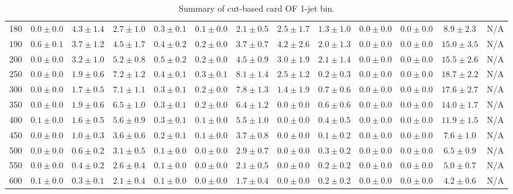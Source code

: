 \begin{table}
{\begin{center}
\begin{tabular}{l | c c | c c c c c c c c  | c c}
180 & $0.0\pm0.0$ & $4.3\pm1.4$ & $2.7\pm1.0$ & $0.3\pm0.1$ & $0.1\pm0.0$ & $2.1\pm0.5$ & $2.5\pm1.7$ & $1.3\pm1.0$ & $0.0\pm0.0$ & $0.0\pm0.0$ & $8.9\pm2.3$ & N/A \\
190 & $0.6\pm0.1$ & $3.7\pm1.2$ & $4.5\pm1.7$ & $0.4\pm0.2$ & $0.2\pm0.0$ & $3.7\pm0.7$ & $4.2\pm2.6$ & $2.0\pm1.3$ & $0.0\pm0.0$ & $0.0\pm0.0$ & $15.0\pm3.5$ & N/A \\
200 & $0.0\pm0.0$ & $3.2\pm1.0$ & $5.2\pm0.8$ & $0.5\pm0.2$ & $0.2\pm0.0$ & $4.5\pm0.9$ & $3.0\pm1.9$ & $2.1\pm1.4$ & $0.0\pm0.0$ & $0.0\pm0.0$ & $15.5\pm2.6$ & N/A \\
250 & $0.0\pm0.0$ & $1.9\pm0.6$ & $7.2\pm1.2$ & $0.4\pm0.1$ & $0.3\pm0.1$ & $8.1\pm1.4$ & $2.5\pm1.2$ & $0.2\pm0.3$ & $0.0\pm0.0$ & $0.0\pm0.0$ & $18.7\pm2.2$ & N/A \\
300 & $0.0\pm0.0$ & $1.7\pm0.5$ & $7.1\pm1.1$ & $0.3\pm0.1$ & $0.2\pm0.0$ & $7.8\pm1.3$ & $1.4\pm1.9$ & $0.7\pm0.6$ & $0.0\pm0.0$ & $0.0\pm0.0$ & $17.6\pm2.7$ & N/A \\
350 & $0.0\pm0.0$ & $1.9\pm0.6$ & $6.5\pm1.0$ & $0.3\pm0.1$ & $0.2\pm0.0$ & $6.4\pm1.2$ & $0.0\pm0.0$ & $0.6\pm0.6$ & $0.0\pm0.0$ & $0.0\pm0.0$ & $14.0\pm1.7$ & N/A \\
400 & $0.1\pm0.0$ & $1.6\pm0.5$ & $5.6\pm0.9$ & $0.3\pm0.1$ & $0.1\pm0.0$ & $5.5\pm1.0$ & $0.0\pm0.0$ & $0.4\pm0.5$ & $0.0\pm0.0$ & $0.0\pm0.0$ & $11.9\pm1.5$ & N/A \\
450 & $0.0\pm0.0$ & $1.0\pm0.3$ & $3.6\pm0.6$ & $0.2\pm0.1$ & $0.1\pm0.0$ & $3.7\pm0.8$ & $0.0\pm0.0$ & $0.1\pm0.2$ & $0.0\pm0.0$ & $0.0\pm0.0$ & $7.6\pm1.0$ & N/A \\
500 & $0.0\pm0.0$ & $0.6\pm0.2$ & $3.1\pm0.5$ & $0.1\pm0.0$ & $0.0\pm0.0$ & $2.9\pm0.7$ & $0.0\pm0.0$ & $0.3\pm0.2$ & $0.0\pm0.0$ & $0.0\pm0.0$ & $6.5\pm0.9$ & N/A \\
550 & $0.0\pm0.0$ & $0.4\pm0.2$ & $2.6\pm0.4$ & $0.1\pm0.0$ & $0.0\pm0.0$ & $2.1\pm0.5$ & $0.0\pm0.0$ & $0.2\pm0.2$ & $0.0\pm0.0$ & $0.0\pm0.0$ & $5.0\pm0.7$ & N/A \\
600 & $0.1\pm0.0$ & $0.3\pm0.1$ & $2.1\pm0.4$ & $0.1\pm0.0$ & $0.0\pm0.0$ & $1.7\pm0.4$ & $0.0\pm0.0$ & $0.2\pm0.2$ & $0.0\pm0.0$ & $0.0\pm0.0$ & $4.2\pm0.6$ & N/A \\
\hline
\end{tabular}
\end{center}
}
\caption{Summary of cut-based card OF 1-jet bin.}
\end{table}
